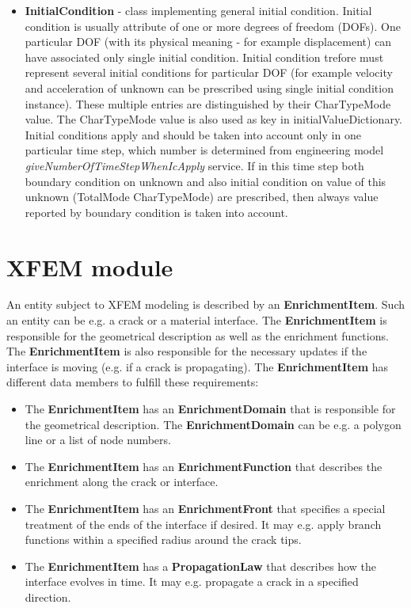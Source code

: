 \documentclass[a4paper]{article}
\newcommand{\class}[1]{{\bf #1}}
\newcommand{\service}[1]{{\em #1}}
\newcommand{\attribute}[1]{#1}
\begin{document}
\begin{itemize}
\item
\class{InitialCondition} - class implementing general initial condition. Initial condition is usually attribute of
one or more degrees of freedom (DOFs). One particular DOF (with its
physical meaning - for example displacement) can have associated only
single initial condition.	Initial condition trefore must represent
several initial conditions for particular DOF (for example velocity
and acceleration of unknown can be prescribed using single initial
condition instance). These multiple entries are distinguished by their
CharTypeMode value.	The CharTypeMode value is also used as key in
\attribute{initialValueDictionary}.
Initial conditions apply and should be taken into account	only in one
particular time step, which number is determined from engineering
model	\service{giveNumberOfTimeStepWhenIcApply} service. If in this
time step both boundary condition on unknown and also initial
condition on value of this unknown (TotalMode CharTypeMode) are
prescribed, then always value reported by boundary condition is taken
into account.
\end{itemize}


\section{XFEM module}
An entity subject to XFEM modeling is described by an \class{EnrichmentItem}.
Such an entity can be e.g. a crack or a material interface. The
\class{EnrichmentItem} is responsible for the geometrical description as well as
the enrichment functions. The \class{EnrichmentItem} is also responsible for the
necessary updates if the interface is moving (e.g. if a crack is propagating).
The \class{EnrichmentItem} has different data members to fulfill these
requirements:
\begin{itemize}
	\item The \class{EnrichmentItem} has an \class{EnrichmentDomain} that is
	responsible for the geometrical description. The \class{EnrichmentDomain} can be e.g. a
polygon line or a list of node numbers.
	\item The \class{EnrichmentItem} has an \class{EnrichmentFunction} that
	describes the enrichment along the crack or interface.
	\item The \class{EnrichmentItem} has an \class{EnrichmentFront} that specifies
	a special treatment of the ends of the interface if desired. It may e.g. apply
	branch functions within a specified radius around the crack tips.
	\item The \class{EnrichmentItem} has a \class{PropagationLaw} that describes
	how the interface evolves in time. It may e.g. propagate a crack in a specified
	direction.
\end{itemize}
\end{document}
